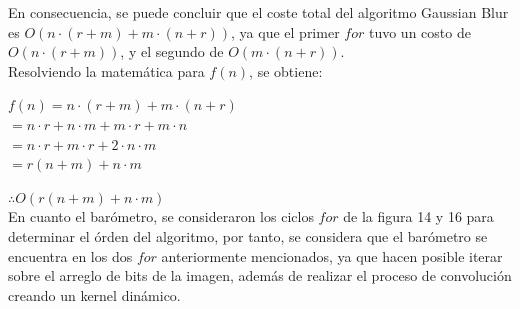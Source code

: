 \documentclass[journal]{IEEEtran}
\begin{document}
\begin{itemize}
		En consecuencia, se puede concluir que el coste total del algoritmo Gaussian Blur es $O(n \cdot (r + m) + m \cdot (n + r))$, ya que el primer $for$ tuvo un costo de $O(n \cdot (r + m))$, y el segundo de $O(m \cdot (n + r))$. \\
		Resolviendo la matemática para $f(n)$, se obtiene: \\
		
		\begin{center}
			$ f(n) = n \cdot (r + m) + m \cdot (n + r) $ \\
			$ = n \cdot r + n \cdot m + m \cdot r + m \cdot n $ \\
			$ = n \cdot r + m \cdot r + 2 \cdot n \cdot m $ \\
			$ = r(n + m) +n \cdot m $ \\
		\end{center}
	
	$\therefore O(r(n + m) +n \cdot m) $ \\
	
	En cuanto el barómetro, se consideraron los ciclos $for$ de la figura 14 y 16 para determinar el órden del algoritmo, por tanto, se considera que el barómetro se encuentra en los dos $for$ anteriormente mencionados, ya que hacen posible iterar sobre el arreglo de bits de la imagen, además de realizar el proceso de convolución creando un kernel dinámico.
	
	\end{itemize}
\end{document}
